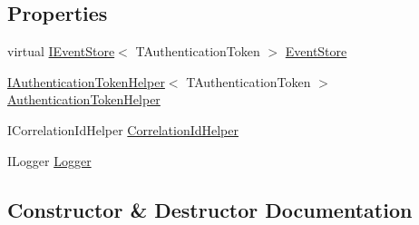 \subsection*{Properties}
\begin{DoxyCompactItemize}
\item 
virtual \hyperlink{interfaceCqrs_1_1Events_1_1IEventStore}{I\+Event\+Store}$<$ T\+Authentication\+Token $>$ \hyperlink{classCqrs_1_1Services_1_1EventService_a07e516aae58050ab225f5ce5f1830ff6_a07e516aae58050ab225f5ce5f1830ff6}{Event\+Store}
\item 
\hyperlink{interfaceCqrs_1_1Authentication_1_1IAuthenticationTokenHelper}{I\+Authentication\+Token\+Helper}$<$ T\+Authentication\+Token $>$ \hyperlink{classCqrs_1_1Services_1_1EventService_a7da2e2ec8d77d5972cea45a7ad482f39_a7da2e2ec8d77d5972cea45a7ad482f39}{Authentication\+Token\+Helper}
\item 
I\+Correlation\+Id\+Helper \hyperlink{classCqrs_1_1Services_1_1EventService_a1c12d11de253a85f7257c412bca1532b_a1c12d11de253a85f7257c412bca1532b}{Correlation\+Id\+Helper}
\item 
I\+Logger \hyperlink{classCqrs_1_1Services_1_1EventService_acd30fea6829b27ee802126c36f8875b4_acd30fea6829b27ee802126c36f8875b4}{Logger}
\end{DoxyCompactItemize}


\subsection{Constructor \& Destructor Documentation}
\mbox{\label{classCqrs_1_1Services_1_1EventService_ac5896c2eb4efbdb42b3cad774b688e45_ac5896c2eb4efbdb42b3cad774b688e45}} 
